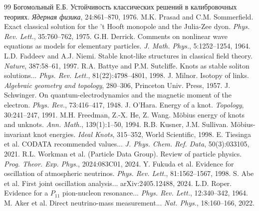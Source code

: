 \documentclass[11pt,a4paper]{article}
\begin{document}
	\begin{thebibliography}{99}
		 Богомольный Е.Б. Устойчивость классических решений в калибровочных теориях. \textit{Ядерная физика}, 24:861--870, 1976.
		 M.K. Prasad and C.M. Sommerfield. Exact classical solution for the 't Hooft monopole and the Julia-Zee dyon. \textit{Phys. Rev. Lett.}, 35:760--762, 1975.
		 G.H. Derrick. Comments on nonlinear wave equations as models for elementary particles. \textit{J. Math. Phys.}, 5:1252--1254, 1964.
		 L.D. Faddeev and A.J. Niemi. Stable knot-like structures in classical field theory. \textit{Nature}, 387:58--61, 1997.
		 R.A. Battye and P.M. Sutcliffe. Knots as stable soliton solutions... \textit{Phys. Rev. Lett.}, 81(22):4798--4801, 1998.
		 J. Milnor. Isotopy of links. \textit{Algebraic geometry and topology}, 280--306, Princeton Univ. Press, 1957.
		 J. Schwinger. On quantum-electrodynamics and the magnetic moment of the electron. \textit{Phys. Rev.}, 73:416--417, 1948.
		 J. O'Hara. Energy of a knot. \textit{Topology}, 30:241--247, 1991.
		 M.H. Freedman, Z.-X. He, Z. Wang. Möbius energy of knots and unknots. \textit{Ann. Math.}, 139(1):1--50, 1994.
		 R.B. Kusner, J.M. Sullivan. Möbius-invariant knot energies. \textit{Ideal Knots}, 315--352, World Scientific, 1998.
		 E. Tiesinga et al. CODATA recommended values... \textit{J. Phys. Chem. Ref. Data}, 50(3):033105, 2021.
		 R.L. Workman et al. (Particle Data Group). Review of particle physics. \textit{Prog. Theor. Exp. Phys.}, 2024:083C01, 2024.
		 Y. Fukuda et al. Evidence for oscillation of atmospheric neutrinos. \textit{Phys. Rev. Lett.}, 81:1562--1567, 1998.
		 S. Abe et al. First joint oscillation analysis... arXiv:2405.12488, 2024.
		 L.D. Roper. Evidence for a $P_{11}$ pion-nucleon resonance... \textit{Phys. Rev. Lett.}, 12:340--342, 1964.
		 M. Aker et al. Direct neutrino-mass measurement... \textit{Nat. Phys.}, 18:160--166, 2022.
	\end{thebibliography}
	
\end{document}
